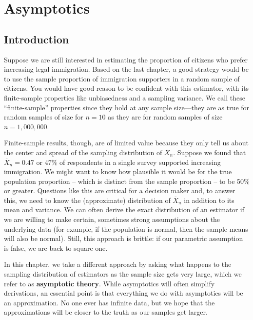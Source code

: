 \documentclass[
  letterpaper,
  DIV=11,
  numbers=noendperiod]{scrreprt}
\newcommand{\Xbar}{\overline{X}}
\theoremstyle{definition}
\theoremstyle{definition}
\theoremstyle{plain}
\theoremstyle{remark}
\begin{document}
\hypertarget{sec-asymptotics}{%
\chapter{Asymptotics}\label{sec-asymptotics}}

\hypertarget{introduction-3}{%
\section{Introduction}\label{introduction-3}}

Suppose we are still interested in estimating the proportion of citizens
who prefer increasing legal immigration. Based on the last chapter, a
good strategy would be to use the sample proportion of immigration
supporters in a random sample of citizens. You would have good reason to
be confident with this estimator, with its finite-sample properties like
unbiasedness and a sampling variance. We call these ``finite-sample''
properties since they hold at any sample size---they are as true for
random samples of size for \(n = 10\) as they are for random samples of
size \(n = 1,000,000\).

Finite-sample results, though, are of limited value because they only
tell us about the center and spread of the sampling distribution of
\(\Xbar_n\). Suppose we found that \(\Xbar_n = 0.47\) or 47\% of
respondents in a single survey supported increasing immigration. We
might want to know how plausible it would be for the true population
proportion -- which is distinct from the sample proportion -- to be 50\%
or greater. Questions like this are critical for a decision maker and,
to answer this, we need to know the (approximate) distribution of
\(\Xbar_n\) in addition to its mean and variance. We can often derive
the exact distribution of an estimator if we are willing to make
certain, sometimes strong assumptions about the underlying data (for
example, if the population is normal, then the sample means will also be
normal). Still, this approach is brittle: if our parametric assumption
is false, we are back to square one.

In this chapter, we take a different approach by asking what happens to
the sampling distribution of estimators as the sample size gets very
large, which we refer to as \textbf{asymptotic theory}. While
asymptotics will often simplify derivations, an essential point is that
everything we do with asymptotics will be an approximation. No one ever
has infinite data, but we hope that the approximations will be closer to
the truth as our samples get larger.
\end{document}
